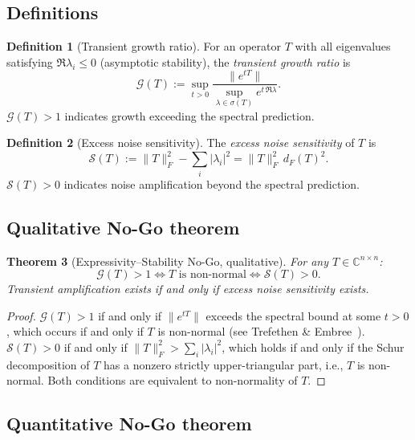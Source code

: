 \documentclass[11pt,a4paper]{article}
\newtheorem{theorem}{Theorem}[section]
\theoremstyle{definition}
\newtheorem{definition}[theorem]{Definition}
\begin{document}
\subsection{Definitions}

\begin{definition}[Transient growth ratio]
For an operator $T$ with all eigenvalues satisfying $\Re \lambda_i \leq 0$
(asymptotic stability), the \emph{transient growth ratio} is
\[
  \mathcal{G}(T) := \sup_{t > 0}
  \frac{\|e^{tT}\|}{\sup_{\lambda \in \sigma(T)} e^{t \,\Re\lambda}}.
\]
$\mathcal{G}(T) > 1$ indicates growth exceeding the spectral prediction.
\end{definition}

\begin{definition}[Excess noise sensitivity]
The \emph{excess noise sensitivity} of $T$ is
\[
  \mathcal{S}(T) := \|T\|_F^2 - \sum_i |\lambda_i|^2 = \|T\|_F^2 \, d_F(T)^2.
\]
$\mathcal{S}(T) > 0$ indicates noise amplification beyond the spectral prediction.
\end{definition}

\subsection{Qualitative No-Go theorem}

\begin{theorem}[Expressivity--Stability No-Go, qualitative]
\label{thm:nogo-qual}
For any $T \in \mathbb{C}^{n \times n}$:
\[
  \mathcal{G}(T) > 1 \iff T \text{ is non-normal} \iff \mathcal{S}(T) > 0.
\]
Transient amplification exists if and only if excess noise sensitivity exists.
\end{theorem}

\begin{proof}
$\mathcal{G}(T) > 1$ if and only if $\|e^{tT}\|$ exceeds the spectral bound
at some $t > 0$, which occurs if and only if $T$ is non-normal
(see Trefethen \& Embree~\cite{trefethen2005}).
$\mathcal{S}(T) > 0$ if and only if $\|T\|_F^2 > \sum_i |\lambda_i|^2$,
which holds if and only if the Schur decomposition of $T$ has a nonzero
strictly upper-triangular part, i.e., $T$ is non-normal.
Both conditions are equivalent to non-normality of $T$.
\end{proof}

\subsection{Quantitative No-Go theorem}
\end{document}
